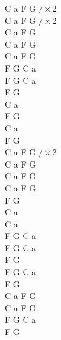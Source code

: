 \documentclass[a5paper, 10pt]{book}
\begin{document}
\begin{minipage}[t]{0.18\textwidth}
C a F G $/\times$2\\
C a F G $/\times$2\\

C a F G\\

C a F G\\
C a F G\\

F G C a\\
F G C a\\ 

F G\\
C a\\
F G\\
C a\\
F G\\

C a F G $/\times$2\\
C a F G\\

C a F G\\
C a F G\\

F G\\
C a\\

C a \\
F G C a\\
F G C a\\
F G \\

F G C a\\
F G\\

C a F G\\
C a F G\\

F G C a\\
F G\\
\end{minipage}
\end{document}
